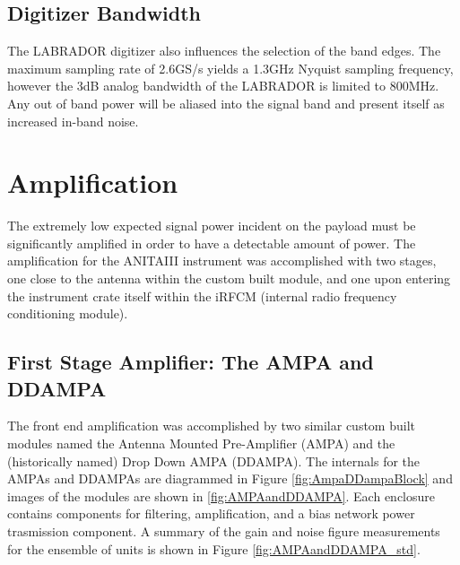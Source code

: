 	\subsection{Digitizer Bandwidth}
		The LABRADOR digitizer also influences the selection of the band edges.  The maximum sampling rate of 2.6GS/s yields a 1.3GHz Nyquist sampling frequency, however the 3dB analog bandwidth of the LABRADOR is limited to 800MHz\cite{LABASICPAPER}.  Any out of band power will be aliased into the signal band and present itself as increased in-band noise\cite{NyquistSampling}. 
		
\section{Amplification}
	The extremely low expected signal power incident on the payload must be significantly amplified in order to have a detectable amount of power.  The amplification for the ANITAIII instrument was accomplished with two stages, one close to the antenna within the custom built module, and one upon entering the instrument crate itself within the iRFCM (internal radio frequency conditioning module).  
	
	\subsection{First Stage Amplifier: The AMPA and DDAMPA}
		The front end amplification was accomplished by two similar custom built modules named the Antenna Mounted Pre-Amplifier (AMPA) and the (historically named) Drop Down AMPA (DDAMPA).  The internals for the AMPAs and DDAMPAs are diagrammed in Figure \ref{fig:AmpaDDampaBlock} and images of the modules are shown in \ref{fig:AMPAandDDAMPA}. Each enclosure contains components for filtering, amplification, and a bias network power trasmission component.  A summary of the gain and noise figure measurements for the ensemble of units is shown in Figure \ref{fig:AMPAandDDAMPA_std}.
		
